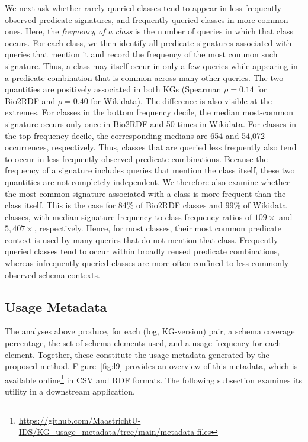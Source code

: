 \documentclass[sw]{iosart2x}
\begin{document}
We next ask whether rarely queried classes tend to appear in less frequently observed predicate signatures, and frequently queried classes in more common ones. Here, the \emph{frequency of a class} is the number of queries in which that class occurs. For each class, we then identify all predicate signatures associated with queries that mention it and record the frequency of the most common such signature. Thus, a class may itself occur in only a few queries while appearing in a predicate combination that is common across many other queries.
The two quantities are positively associated in both KGs (Spearman $\rho = 0.14$ for Bio2RDF and $\rho = 0.40$ for Wikidata). The difference is also visible at the extremes. For classes in the bottom frequency decile, the median most-common signature occurs only once in Bio2RDF and 50 times in Wikidata. For classes in the top frequency decile, the corresponding medians are 654 and 54{,}072 occurrences, respectively. Thus, classes that are queried less frequently also tend to occur in less frequently observed predicate combinations.
Because the frequency of a signature includes queries that mention the class itself, these two quantities are not completely independent. We therefore also examine whether the most common signature associated with a class is more frequent than the class itself. This is the case for 84\% of Bio2RDF classes and 99\% of Wikidata classes, with median signature-frequency-to-class-frequency ratios of $109\times$ and $5{,}407\times$, respectively. Hence, for most classes, their most common predicate context is used by many queries that do not mention that class. Frequently queried classes tend to occur within broadly reused predicate combinations, whereas infrequently queried classes are more often confined to less commonly observed schema contexts.


\subsection{Usage Metadata}\label{sec:usagemetadata}
The analyses above produce, for each (log, KG-version) pair, a schema coverage percentage, the set of schema elements used, and a usage frequency for each element. Together, these constitute the usage metadata generated by the proposed method. Figure~\ref{fig:l9} provides an overview of this metadata, which is available online\footnote{\url{https://github.com/MaastrichtU-IDS/KG_usage_metadata/tree/main/metadata-files}} in CSV and RDF formats. The following subsection examines its utility in a downstream application.
\end{document}
